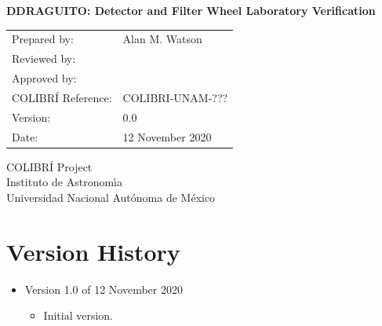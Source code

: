 \documentclass{article}
\begin{document}
\pagestyle{empty}

\begin{center}

{\Large \bfseries DDRAGUITO: Detector and Filter Wheel Laboratory Verification}

\vspace{2cm}

\begin{tabular}{ll}
Prepared by:&Alan M. Watson\\
Reviewed by:&\\
Approved by:&\\
COLIBRÍ Reference:&COLIBRI-UNAM-???\\
Version:&0.0\\
Date:&12 November 2020\\
\end{tabular}

\vspace{\fill}

COLIBRÍ Project\\
Instituto de Astronom{\'\i}a\\
Universidad Nacional Aut\'onoma de M\'exico

\end{center}

\newpage

\clearpage
\section*{Version History}

\begin{itemize}

\item Version 1.0 of 12 November 2020

\begin{itemize}
    \item Initial version.
\end{itemize}

\end{itemize}


\clearpage

\pagestyle{plain}

\setcounter{tocdepth}{2}
\tableofcontents
\newpage


\end{document}
